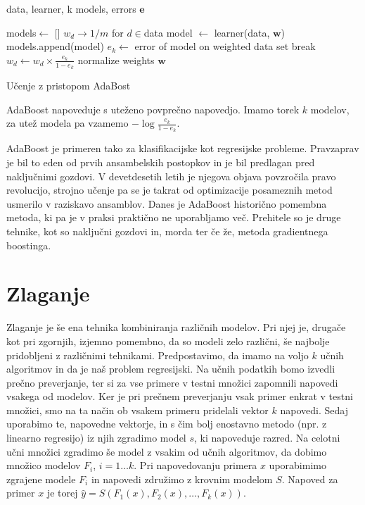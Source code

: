 \begin{algorithm}
  \begin{algorithmic}
    \REQUIRE data, learner, k
    \ENSURE models, errors $\bm e$

  \STATE models$\leftarrow$ []
  \STATE $w_d\to 1/m$ for $d\in$data
  \STATE model $\leftarrow$ learner(data, $\bm w$)
  \STATE models.append(model)
  \STATE $e_k\leftarrow$ error of model on weighted data set
  \STATE break
  \ENDIF
  \STATE $w_d\leftarrow w_d\times\frac{e_k}{1-e_k}$
  \ENDFOR
  \STATE normalize weights $\bm w$
  \ENDFOR
\end{algorithmic}
\caption{Učenje z pristopom AdaBost}
\label{alg:adaboost}
\end{algorithm}

AdaBoost napoveduje s uteženo povprečno napovedjo. Imamo torek $k$ modelov, za utež modela pa vzamemo $-\log\frac{e_k}{1-e_k}$.

AdaBoost je primeren tako za klasifikacijske kot regresijske probleme. Pravzaprav je bil to eden od prvih ansambelskih postopkov in je bil predlagan pred naključnimi gozdovi. V devetdesetih letih je njegova objava povzročila pravo revolucijo, strojno učenje pa se je takrat od optimizacije posameznih metod usmerilo v raziskavo ansamblov. Danes je AdaBoost historično pomembna metoda, ki pa je v praksi praktično ne uporabljamo več. Prehitele so je druge tehnike, kot so naključni gozdovi in, morda ter če že, metoda gradientnega boostinga.

\section{Zlaganje}

Zlaganje  je še ena tehnika kombiniranja različnih modelov. Pri njej je, drugače kot pri zgornjih, izjemno pomembno, da so modeli zelo različni, še najbolje pridobljeni z različnimi tehnikami. Predpostavimo, da imamo na voljo $k$ učnih algoritmov in da je naš problem regresijski. Na učnih podatkih bomo izvedli prečno preverjanje, ter si za vse primere v testni množici zapomnili napovedi vsakega od modelov. Ker je pri prečnem preverjanju vsak primer enkrat v testni množici, smo na ta način ob vsakem primeru pridelali vektor $k$ napovedi. Sedaj uporabimo te, napovedne vektorje, in s čim bolj enostavno metodo (npr. z linearno regresijo) iz njih zgradimo model $s$, ki napoveduje razred. Na celotni učni množici zgradimo še model z vsakim od učnih algoritmov, da dobimo množico modelov $F_i$, $i=1\ldots k$. Pri napovedovanju primera $x$ uporabimimo zgrajene modele $F_i$ in napovedi združimo z krovnim modelom $S$. Napoved za primer $x$ je torej $\hat{y}=S(F_1(x),F_2(x),\ldots,F_k(x))$.

